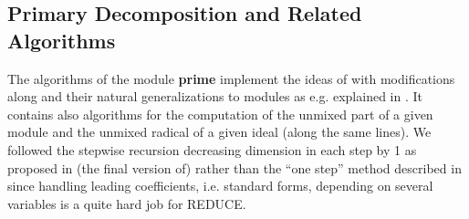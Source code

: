 \subsection{Primary Decomposition and Related Algorithms}

The algorithms of the module {\bf prime} implement the ideas of
\cite{GTZ} with modifications along \cite{Kr} and their natural
generalizations to modules as e.g. explained in \cite{Ru}. It
contains also algorithms for the computation of the unmixed part of a
given module and the unmixed radical of a given ideal (along the same
lines). We followed the stepwise recursion decreasing dimension in
each step by 1 as proposed in (the final version of) \cite{GTZ}
rather than the ``one step'' method described in \cite{BKW} since
handling leading coefficients, i.e. standard forms, depending on
several variables is a quite hard job for REDUCE.

